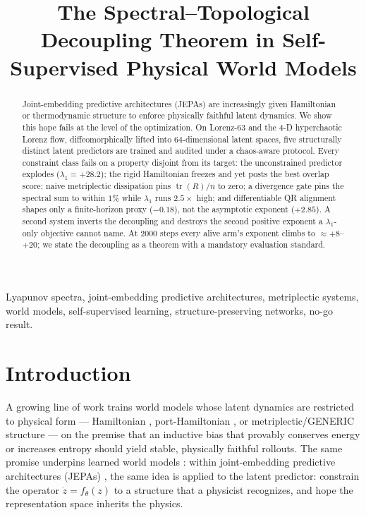 \documentclass[journal]{IEEEtran}
\title{The Spectral--Topological Decoupling Theorem in
Self-Supervised Physical World Models}
\author{\IEEEauthorblockN{Sehaj Randhir Singh}
\IEEEauthorblockA{Independent researcher; partial affiliation with
NYU Tandon School of Engineering, New York University,
Brooklyn, NY, USA. Corresponding author: \FILL{email}}}
\newcommand{\tr}{\operatorname{tr}}
\begin{document}
\maketitle

\begin{abstract}
Joint-embedding predictive architectures (JEPAs) are increasingly given
Hamiltonian or thermodynamic structure to enforce physically faithful
latent dynamics. We show this hope fails at the level of the
optimization. On Lorenz-63 and the 4-D hyperchaotic Lorenz flow,
diffeomorphically lifted into 64-dimensional latent spaces, five
structurally distinct latent predictors are trained and audited under a
chaos-aware protocol. Every constraint class fails on a property disjoint from its target: the
unconstrained predictor explodes ($\lambda_1=+28.2$); the rigid
Hamiltonian freezes and yet posts the best overlap score; naive
metriplectic dissipation pins $\tr(R)/n$ to zero; a divergence gate pins
the spectral sum to within $1\%$ while $\lambda_1$ runs $2.5\times$ high;
and differentiable QR alignment shapes only a finite-horizon proxy
($-0.18$), not the asymptotic exponent ($+2.85$). A second system
inverts the decoupling and destroys the second positive exponent a
$\lambda_1$-only objective cannot name. At 2000 steps every alive arm's
exponent climbs to $\approx{+}8$--$+20$; we state the decoupling as a
theorem with a mandatory evaluation standard.
\end{abstract}

\begin{IEEEkeywords}
Lyapunov spectra, joint-embedding predictive architectures, metriplectic
systems, world models, self-supervised learning, structure-preserving
networks, no-go result.
\end{IEEEkeywords}

\section{Introduction}
\label{sec:intro}

A growing line of work trains world models whose latent dynamics are
restricted to physical form --- Hamiltonian \cite{greydanus2019hamiltonian,
cranmer2020lagrangian}, port-Hamiltonian \cite{van2020port}, or
metriplectic/GENERIC \cite{morrison1986metriplectic,grmela1997dynamics,
ottinger1997dynamics} structure --- on the premise that an inductive bias
that provably conserves energy or increases entropy should yield stable,
physically faithful rollouts. The same promise underpins learned world
models \cite{ha2018world,hafner2020mastering,bruce2024genie}: within
joint-embedding predictive architectures (JEPAs)
\cite{lecun2022pathway,assran2023self,bardes2024revisiting,garrido2024learning},
the same idea is applied to the latent predictor: constrain the operator
$\dot z = f_\theta(z)$ to a structure that a physicist recognizes, and
hope the representation space inherits the physics.
\end{document}
